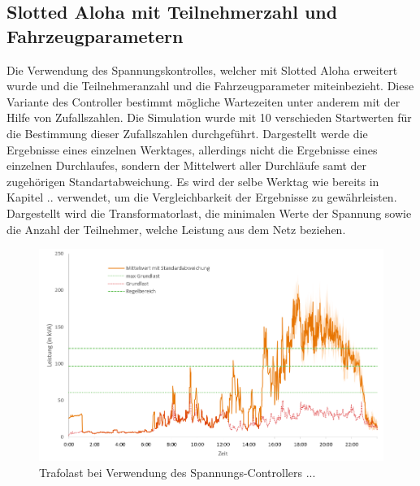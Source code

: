 \subsection{Slotted Aloha mit Teilnehmerzahl und Fahrzeugparametern}
Die Verwendung des Spannungskontrolles, welcher mit Slotted Aloha erweitert wurde und die Teilnehmeranzahl und die Fahrzeugparameter miteinbezieht. Diese Variante des Controller bestimmt mögliche Wartezeiten unter anderem mit der Hilfe von Zufallszahlen. Die Simulation wurde mit 10 verschieden Startwerten für die Bestimmung dieser Zufallszahlen durchgeführt. Dargestellt werde die Ergebnisse eines einzelnen Werktages, allerdings nicht die Ergebnisse eines einzelnen Durchlaufes, sondern der Mittelwert aller Durchläufe samt der zugehörigen Standartabweichung. Es wird der selbe Werktag wie bereits in Kapitel .. verwendet, um die Vergleichbarkeit der Ergebnisse zu gewährleisten. Dargestellt wird die Transformatorlast, die minimalen Werte der Spannung sowie die Anzahl der Teilnehmer, welche Leistung aus dem Netz beziehen. 
\begin{figure}[htb]
\centering
	\includegraphics[scale=0.7]{img/SA_wT/TrafoLast3.png}
	\caption{Trafolast bei Verwendung des Spannungs-Controllers ...}
	\label{Abb_SAwtTrafoLast}
\end{figure}

